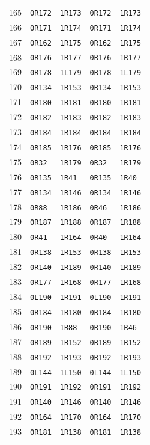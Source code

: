 {\begin{longtable}{rllll}
165 & \texttt{0R172} & \texttt{1R173} & \texttt{0R172} & \texttt{1R173}\\
166 & \texttt{0R171} & \texttt{1R174} & \texttt{0R171} & \texttt{1R174}\\
167 & \texttt{0R162} & \texttt{1R175} & \texttt{0R162} & \texttt{1R175}\\
168 & \texttt{0R176} & \texttt{1R177} & \texttt{0R176} & \texttt{1R177}\\
169 & \texttt{0R178} & \texttt{1L179} & \texttt{0R178} & \texttt{1L179}\\
170 & \texttt{0R134} & \texttt{1R153} & \texttt{0R134} & \texttt{1R153}\\
171 & \texttt{0R180} & \texttt{1R181} & \texttt{0R180} & \texttt{1R181}\\
172 & \texttt{0R182} & \texttt{1R183} & \texttt{0R182} & \texttt{1R183}\\
173 & \texttt{0R184} & \texttt{1R184} & \texttt{0R184} & \texttt{1R184}\\
174 & \texttt{0R185} & \texttt{1R176} & \texttt{0R185} & \texttt{1R176}\\
175 & \texttt{0R32} & \texttt{1R179} & \texttt{0R32} & \texttt{1R179}\\
176 & \texttt{0R135} & \texttt{1R41} & \texttt{0R135} & \texttt{1R40}\\
177 & \texttt{0R134} & \texttt{1R146} & \texttt{0R134} & \texttt{1R146}\\
178 & \texttt{0R88} & \texttt{1R186} & \texttt{0R46} & \texttt{1R186}\\
179 & \texttt{0R187} & \texttt{1R188} & \texttt{0R187} & \texttt{1R188}\\
180 & \texttt{0R41} & \texttt{1R164} & \texttt{0R40} & \texttt{1R164}\\
181 & \texttt{0R138} & \texttt{1R153} & \texttt{0R138} & \texttt{1R153}\\
182 & \texttt{0R140} & \texttt{1R189} & \texttt{0R140} & \texttt{1R189}\\
183 & \texttt{0R177} & \texttt{1R168} & \texttt{0R177} & \texttt{1R168}\\
184 & \texttt{0L190} & \texttt{1R191} & \texttt{0L190} & \texttt{1R191}\\
185 & \texttt{0R184} & \texttt{1R180} & \texttt{0R184} & \texttt{1R180}\\
186 & \texttt{0R190} & \texttt{1R88} & \texttt{0R190} & \texttt{1R46}\\
187 & \texttt{0R189} & \texttt{1R152} & \texttt{0R189} & \texttt{1R152}\\
188 & \texttt{0R192} & \texttt{1R193} & \texttt{0R192} & \texttt{1R193}\\
189 & \texttt{0L144} & \texttt{1L150} & \texttt{0L144} & \texttt{1L150}\\
190 & \texttt{0R191} & \texttt{1R192} & \texttt{0R191} & \texttt{1R192}\\
191 & \texttt{0R140} & \texttt{1R146} & \texttt{0R140} & \texttt{1R146}\\
192 & \texttt{0R164} & \texttt{1R170} & \texttt{0R164} & \texttt{1R170}\\
193 & \texttt{0R181} & \texttt{1R138} & \texttt{0R181} & \texttt{1R138}\\
\bottomrule\end{longtable}}
